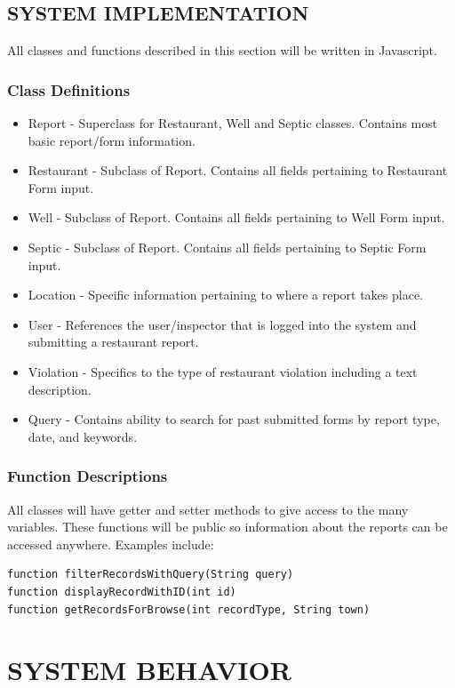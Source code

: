\documentclass[twoside,letterpaper]{article}
\begin{document}
\subsection[SYSTEM IMPLEMENTATION]{\rmfamily\bfseries\color{black}
SYSTEM IMPLEMENTATION}
{\rmfamily\color{black}
All classes and functions described in this section will be written in Javascript.
\subsubsection{Class Definitions}
\begin{itemize}
\item Report - Superclass for Restaurant, Well and Septic classes. Contains most basic report/form information.
\item Restaurant - Subclass of Report. Contains all fields pertaining to Restaurant Form input.
\item Well -  Subclass of Report. Contains all fields pertaining to Well  Form input.
\item Septic - Subclass of Report. Contains all fields pertaining to Septic Form input.
\item Location - Specific information pertaining to where a report takes place.
\item User - References the user/inspector that is logged into the system and submitting a restaurant report.
\item Violation - Specifics to the type of restaurant violation including a text description.
\item Query - Contains ability to search for past submitted forms by report type, date, and keywords.
\end{itemize}
\subsubsection{Function Descriptions}
All classes will have getter and setter methods to give access to the many variables. These functions will be public so information about the reports can be accessed anywhere. Examples include:
\begin{center}
\begin{verbatim}
function filterRecordsWithQuery(String query)
function displayRecordWithID(int id)
function getRecordsForBrowse(int recordType, String town)
\end{verbatim}
\end{center}

\clearpage\section[SYSTEM BEHAVIOR]{\rmfamily\bfseries\color{black}
SYSTEM BEHAVIOR}

}
\end{document}
